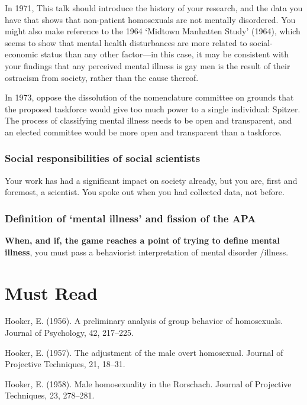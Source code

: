 \begin{refsection}
In 1971, This talk should introduce the history of your research, and the data you have that shows that non-patient homosexuals are not mentally disordered. You might also make reference to the 1964 ‘Midtown Manhatten Study’ (1964), which seems to show that mental health disturbances are more related to social-economic status than any other factor—in this case, it may be consistent with your findings that any perceived mental illness is gay men is the result of their ostracism from society, rather than the cause thereof. 

In 1973, oppose the dissolution of the nomenclature committee on grounds that the proposed taskforce would give too much power to a single individual: Spitzer. The process of classifying mental illness needs to be open and transparent, and an elected committee would be more open and transparent than a taskforce.

\subsubsection{Social responsibilities of social scientists}
\label{socialresponsibilitiesofsocialscientists}

Your work has had a significant impact on society already, but you are, first and foremost, a scientist. You spoke out when you had collected data, not before.

\subsubsection{Definition of ‘mental illness’ and fission of the APA}
\label{definitionof‘mentalillness’andfissionoftheapa}

\textbf{When, and if, the game reaches a point of trying to define mental illness}, you must pass a behaviorist interpretation of mental disorder \slash  illness.

\section{Must Read}
\label{mustread}

Hooker, E. (1956). A preliminary analysis of group behavior of homosexuals. Journal of Psychology, 42, 217--225.

Hooker, E. (1957). The adjustment of the male overt homosexual. Journal of Projective Techniques, 21, 18--31.

Hooker, E. (1958). Male homosexuality in the Rorschach. Journal of Projective Techniques, 23, 278--281.


\end{refsection}
